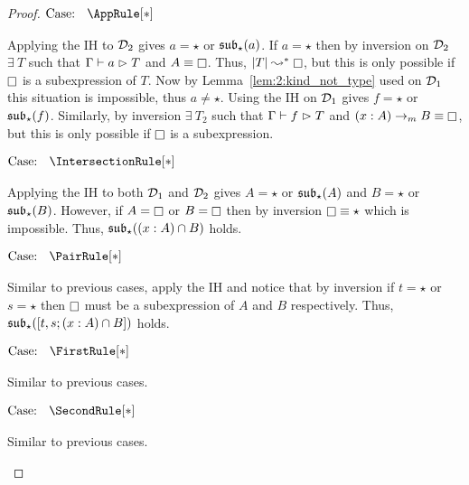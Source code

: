 \begin{proof}
    $\text{Case: }\begin{array}{c} \AppRule[*] \end{array}$
    \begin{proofcase}
        Applying the IH to $\mathcal{D}_{2}$ gives $a = \star$ or $\mathfrak{sub}_\star(a)$.
        If $a = \star$ then by inversion on $\mathcal{D}_{2}$ $\exists\ T$ such that $\Gamma \vdash a \vartriangleright T$ and $A \equiv \kind$.
        Thus, $|T| \betastar \kind$, but this is only possible if $\kind$ is a subexpression of $T$.
        Now by Lemma~\ref{lem:2:kind_not_type} used on $\mathcal{D}_{1}$ this situation is impossible, thus $a \neq \star$.
        Using the IH on $\mathcal{D}_{1}$ gives $f = \star$ or $\mathfrak{sub}_\star(f)$.
        Similarly, by inversion $\exists\ T_2$ such that $\Gamma \vdash f \vartriangleright T$ and $(x : A) \to_m B \equiv \kind$, but this is only possible if $\kind$ is a subexpression.
    \end{proofcase}

    $\text{Case: }\begin{array}{c} \IntersectionRule[*] \end{array}$
    \begin{proofcase}
        Applying the IH to both $\mathcal{D}_{1}$ and $\mathcal{D}_{2}$ gives $A = \star$ or $\mathfrak{sub}_\star(A)$ and $B = \star$ or $\mathfrak{sub}_\star(B)$.
        However, if $A = \kind$ or $B = \kind$ then by inversion $\kind \equiv \star$ which is impossible.
        Thus, $\mathfrak{sub}_\star((x : A) \cap B)$ holds.
    \end{proofcase}

    $\text{Case: }\begin{array}{c} \PairRule[*] \end{array}$
    \begin{proofcase}
        Similar to previous cases, apply the IH and notice that by inversion if $t = \star$ or $s = \star$ then $\kind$ must be a subexpression of $A$ and $B$ respectively.
        Thus, $\mathfrak{sub}_\star([t, s; (x : A) \cap B])$ holds.
    \end{proofcase}

    $\text{Case: }\begin{array}{c} \FirstRule[*] \end{array}$
    \begin{proofcase}
        Similar to previous cases.
    \end{proofcase}

    $\text{Case: }\begin{array}{c} \SecondRule[*] \end{array}$
    \begin{proofcase}
        Similar to previous cases.
    \end{proofcase}


\end{proof}
